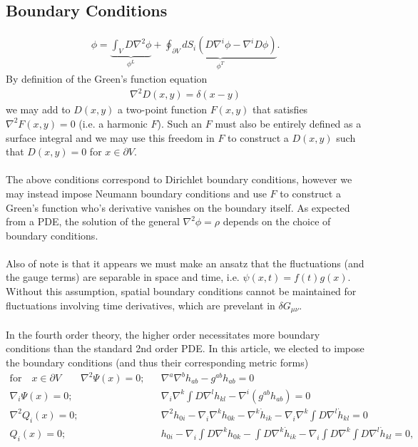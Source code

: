 \documentclass[10pt,letterpaper]{article}
\numberwithin{equation}{section}
\begin{document}
\newpage
\begin{appendices}
%
%
\section{Boundary Conditions}
%
%
\begin{eqnarray}
\phi =\underbrace{\int_V D \nabla^2 \phi}_{\phi^L} + \underbrace{\oint_{\partial V} dS_i \left( D \nabla^i \phi - \nabla^i D \phi\right)}_{\phi^T}.
\label{phidecomp}
\end{eqnarray}
By definition of the Green's function equation
\begin{eqnarray}
\nabla^2 D(x,y) = \delta(x-y)
\end{eqnarray}
we may add to $D(x,y)$ a two-point function $F(x,y)$ that satisfies $\nabla^2 F(x,y) = 0$ (i.e. a harmonic $F$). Such an $F$ must also be entirely defined as a surface integral and  we may use this freedom in $F$ to construct a $D(x,y)$ such that $D(x,y)=0$ for $x\in \partial V$. 
\\ \\
The above conditions correspond to Dirichlet boundary conditions, however we may instead impose Neumann boundary conditions and use $F$ to construct a Green's function who's derivative vanishes on the boundary itself. As expected from a PDE, the solution of the general $\nabla^2 \phi = \rho$ depends on the choice of boundary conditions.
\\ \\
Also of note is that it appears we must make an ansatz that the fluctuations (and the gauge terms) are separable in space and time, i.e. $\psi(x,t) = f(t)g(x)$. Without this assumption, spatial boundary conditions cannot be maintained for fluctuations involving time derivatives, which are prevelant in $\delta G_{\mu\nu}$. 
\\ \\
In the fourth order theory, the higher order necessitates more boundary conditions than the standard 2nd order PDE. In this article, we elected to impose the boundary conditions (and thus their corresponding metric forms)
\begin{eqnarray}
\text{for}\quad x\in \partial V\qquad \nabla^2 \Psi(x) =0; && \nabla^a\nabla^b h_{ab} - g^{ab}h_{ab}=0
\nonumber\\
\nabla_i \Psi(x)=0; && \nabla_i\nabla^k\int D \nabla^l h_{kl} - \nabla^i(g^{ab}h_{ab})=0
\nonumber\\
\nabla^2 Q_i(x)=0; && \nabla^2 h_{0i}-\nabla_i\nabla^k h_{0k} -\nabla^k \dot h_{ik} - \nabla_i\nabla^k \int D\nabla^l \dot h_{kl}=0
\nonumber\\
Q_i(x) =0; && h_{0i}-\nabla_i\int D\nabla^k h_{0k}-\int D\nabla^k \dot h_{ik}-\nabla_i \int D\nabla^k \int D \nabla^l \dot h_{kl}=0,
\label{bcdw2}
\end{eqnarray}
%
%

\end{appendices}
\end{document}
